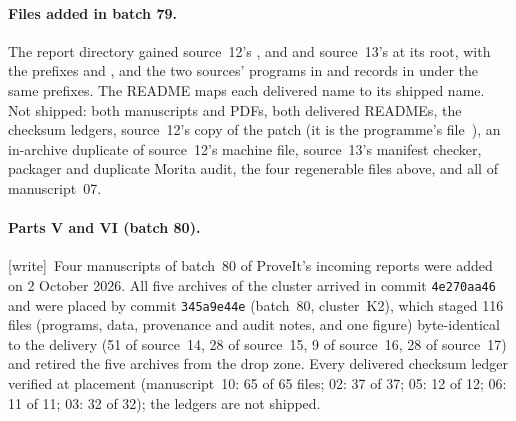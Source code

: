 \documentclass[11pt,letterpaper]{article}
\numberwithin{equation}{section}
\theoremstyle{definition}
\theoremstyle{remark}
\newcommand{\wtag}{\textup{[write]}}
\begin{document}
\paragraph{Files added in batch 79.} The report directory gained source~12's ,  and  and source~13's  at its root, with the prefixes  and , and the two sources' programs in  and records in  under the same prefixes. The README maps each delivered name to its shipped name. Not shipped: both manuscripts and PDFs, both delivered READMEs, the checksum ledgers, source~12's copy of the patch (it is the programme's file~\cite{reviewcs}), an in-archive duplicate of source~12's machine file, source~13's manifest checker, packager and duplicate Morita audit, the four regenerable files above, and all of manuscript~07.
\paragraph{Parts V and VI (batch 80).} \wtag\ Four manuscripts of batch~80 of ProveIt's incoming reports were added on 2 October 2026. All five archives of the cluster arrived in commit \texttt{4e270aa46} and were placed by commit \texttt{345a9e44e} (batch~80, cluster~K2), which staged 116 files (programs, data, provenance and audit notes, and one figure) byte-identical to the delivery (51 of source~14, 28 of source~15, 9 of source~16, 28 of source~17) and retired the five archives from the drop zone. Every delivered checksum ledger verified at placement (manuscript~10: 65 of 65 files; 02: 37 of 37; 05: 12 of 12; 06: 11 of 11; 03: 32 of 32); the ledgers are not shipped.
\end{document}
